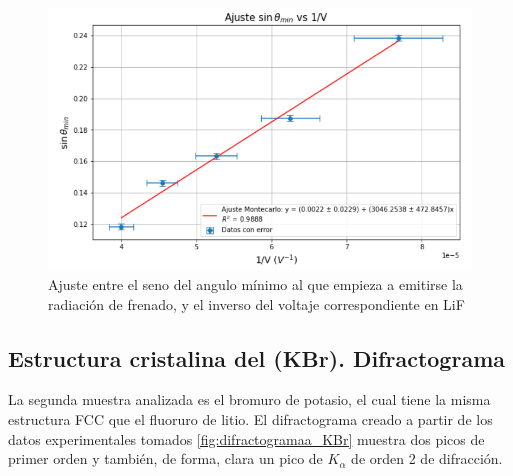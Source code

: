                                                                                                              
\begin{figure}[H]
  	\centering
  	\begin{minipage}{0.6\textwidth} 
  		\includegraphics[width=\textwidth]{grafico_2x04_Lif_sin_1_V.png}
  		\caption{\footnotesize Ajuste entre el seno del angulo mínimo al que empieza a emitirse la radiación de frenado, y el inverso del voltaje correspondiente en LiF}
  		\label{fig:Lif_sin_1_V}
  	\end{minipage}
\end{figure}                                                                                                           



\subsection{Estructura cristalina del (KBr). Difractograma}

La segunda muestra analizada es el bromuro de potasio, el cual tiene la misma estructura FCC que  el fluoruro de litio. El difractograma creado a partir de los datos experimentales tomados \ref{fig:difractogramaa_KBr} muestra dos picos de primer orden y también, de forma, clara un pico de $K_{\alpha}$ de orden 2 de difracción. 


